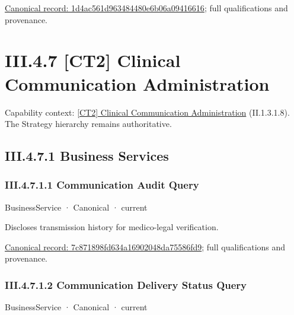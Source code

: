 {\footnotesize \href{../../../../continuum/business/business-function/1d4ac561d963484480e6b06a09416616.md}{Canonical record: 1d4ac561d963484480e6b06a09416616}; full qualifications and provenance.}\par
\section*{III.4.7 [CT2] Clinical Communication Administration}
\label{navigation:III.4.7}

{\small Capability context: \hyperref[element:b38f2c2811724734b5887b6dbaaabbfc]{[CT2] Clinical Communication Administration} (II.1.3.1.8). The Strategy hierarchy remains authoritative.}\par
\subsection*{III.4.7.1 Business Services}
\label{navigation:III.4.7.1}

\subsubsection*{III.4.7.1.1 Communication Audit Query}
\label{navigation:III.4.7.1.1}

\label{element:7c871898fd634a16902048da75586fd9}
{\small BusinessService · Canonical · current}\par

Discloses transmission history for medico-legal verification.


{\footnotesize \href{../../../../continuum/business/business-service/7c871898fd634a16902048da75586fd9.md}{Canonical record: 7c871898fd634a16902048da75586fd9}; full qualifications and provenance.}\par
\subsubsection*{III.4.7.1.2 Communication Delivery Status Query}
\label{navigation:III.4.7.1.2}

\label{element:1b3447db9891406b951f6a6ccf20763e}
{\small BusinessService · Canonical · current}\par

